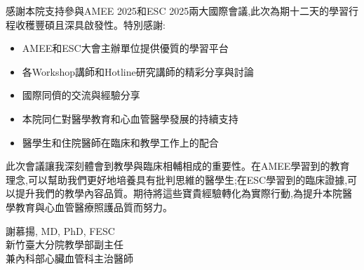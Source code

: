 \documentclass[12pt,a4paper]{article}
\newcommand{\mydate}{\DTMtoday}
\begin{document}
感謝本院支持參與AMEE 2025和ESC 2025兩大國際會議,此次為期十二天的學習行程收穫豐碩且深具啟發性。特別感謝:

\begin{itemize}[nosep]
    \item AMEE和ESC大會主辦單位提供優質的學習平台
    \item 各Workshop講師和Hotline研究講師的精彩分享與討論
    \item 國際同儕的交流與經驗分享
    \item 本院同仁對醫學教育和心血管醫學發展的持續支持
    \item 醫學生和住院醫師在臨床和教學工作上的配合
\end{itemize}

此次會議讓我深刻體會到教學與臨床相輔相成的重要性。在AMEE學習到的教育理念,可以幫助我們更好地培養具有批判思維的醫學生;在ESC學習到的臨床證據,可以提升我們的教學內容品質。期待將這些寶貴經驗轉化為實際行動,為提升本院醫學教育與心血管醫療照護品質而努力。

\vspace{1cm}
\begin{flushright}
謝慕揚, MD, PhD, FESC\\
新竹臺大分院教學部副主任\\
兼內科部心臟血管科主治醫師\\
\mydate
\end{flushright}
\end{document}
